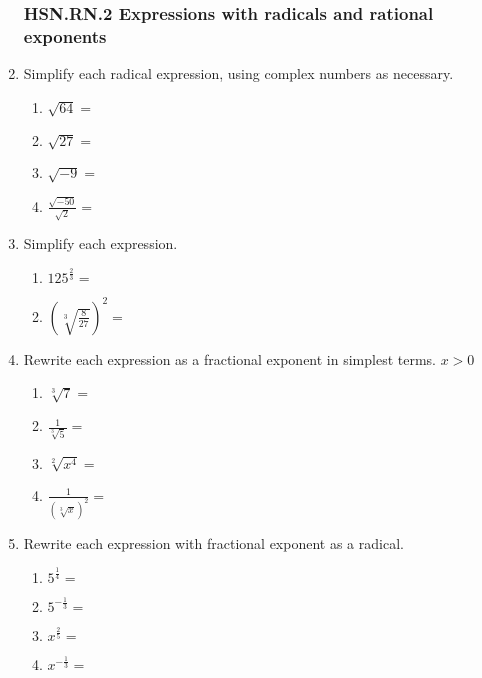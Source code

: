 \documentclass[12pt, twoside]{article}
\begin{document}
\begin{enumerate}[itemsep=0.5cm]
\newpage

\subsubsection*{HSN.RN.2 Expressions with radicals and rational exponents}
\item Simplify each radical expression, using complex numbers as necessary.
    \begin{multicols}{2}
    \begin{enumerate}[itemsep=0.5cm]
        \item $\sqrt{64}=$
        \item $\sqrt{27}=$
        \item $\sqrt{-9}=$
        \item $\displaystyle \frac{\sqrt{-50}}{\sqrt{2}}=$
    \end{enumerate}
    \end{multicols} \vspace{1cm}
    
\item Simplify each expression.
    \begin{multicols}{2}
    \begin{enumerate}[itemsep=0.5cm]
        \item $\displaystyle 125^{\frac{2}{3}} =$
        \item $\left( \sqrt[3]{\frac{8}{27}} \right)^{2} =$
    \end{enumerate}
    \end{multicols} \vspace{2cm}

    
\item Rewrite each expression as a fractional exponent in simplest terms. $x>0$
    \begin{multicols}{2}
      \begin{enumerate}[itemsep=1cm]
          \item $\sqrt[3]{7} =$
          \item $\displaystyle \frac{1}{\sqrt[3]{5}}=$
          \item $\sqrt[2]{x^4} =$
          \item $\displaystyle \frac{1}{(\sqrt[3]{x})^2}=$
      \end{enumerate}
      \end{multicols} \vspace{1cm}
  
\item Rewrite each expression with fractional exponent as a radical.
    \begin{multicols}{2}
      \begin{enumerate}[itemsep=1cm]
        \item $\displaystyle 5^{\frac{1}{4}}=$
        \item $\displaystyle 5^{-\frac{1}{3}}=$
        \item $\displaystyle x^{\frac{2}{5}}=$
        \item $\displaystyle x^{-\frac{1}{3}}=$
      \end{enumerate}
      \end{multicols}
        

\end{enumerate}
\end{document}
